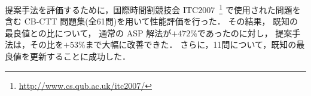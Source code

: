 提案手法を評価するために，国際時間割競技会 ITC2007~\footnote{\url{http://www.cs.qub.ac.uk/itc2007/}}
で使用された問題を含む CB-CTT 問題集(全61問)を用いて性能評価を行った．
その結果，
既知の最良値との比について，
通常の ASP 解法が$+472\%$であったのに対し，
提案手法は，その比を$+53\%$まで大幅に改善できた．
さらに，11問について，既知の最良値を更新することに成功した．


